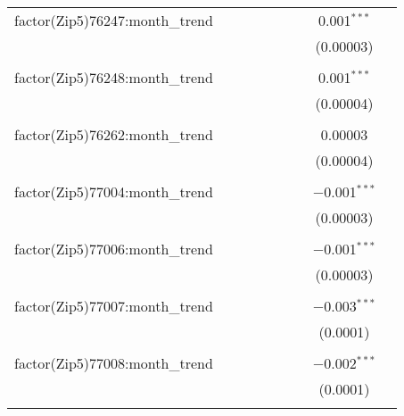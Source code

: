 \begin{table}[H]
{\begin{tabular}{@{\extracolsep{5pt}}lcccccccc}
  factor(Zip5)76247:month\_trend &  &  &  &  &  &  & 0.001$^{***}$ &  \\  

   &  &  &  &  &  &  & (0.00003) &  \\  

   & & & & & & & & \\  

  factor(Zip5)76248:month\_trend &  &  &  &  &  &  & 0.001$^{***}$ &  \\  

   &  &  &  &  &  &  & (0.00004) &  \\  

   & & & & & & & & \\  

  factor(Zip5)76262:month\_trend &  &  &  &  &  &  & 0.00003 &  \\  

   &  &  &  &  &  &  & (0.00004) &  \\  

   & & & & & & & & \\  

  factor(Zip5)77004:month\_trend &  &  &  &  &  &  & $-$0.001$^{***}$ &  \\  

   &  &  &  &  &  &  & (0.00003) &  \\  

   & & & & & & & & \\  

  factor(Zip5)77006:month\_trend &  &  &  &  &  &  & $-$0.001$^{***}$ &  \\  

   &  &  &  &  &  &  & (0.00003) &  \\  

   & & & & & & & & \\  

  factor(Zip5)77007:month\_trend &  &  &  &  &  &  & $-$0.003$^{***}$ &  \\  

   &  &  &  &  &  &  & (0.0001) &  \\  

   & & & & & & & & \\  

  factor(Zip5)77008:month\_trend &  &  &  &  &  &  & $-$0.002$^{***}$ &  \\  

   &  &  &  &  &  &  & (0.0001) &  \\  

   & & & & & & & & \\  


\end{tabular}}
\end{table}
